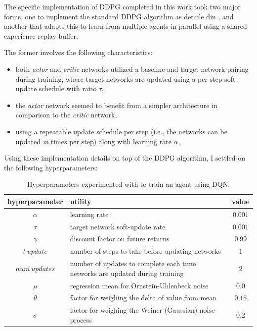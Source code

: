 \documentclass[11pt]{article}
\begin{document}
The specific implementation of DDPG completed in this work took two major forms, one to implement the standard DDPG algorithm as detaile din \cite{ddpg}, and another that adapts this to learn from multiple agents in parallel using a shared experience replay buffer.

The former involves the following characteristics:
\begin{itemize}
	\item both \textit{actor} and \textit{critic} networks utilized a baseline and target network pairing during training, where target networks are updated using a per-step soft-update schedule with ratio $\tau$,
	\item the \textit{actor} network seemed to benefit from a simpler architecture in comparison to the \textit{critic} network,
	\item using a repeatable update schedule per step (i.e., the networks can be updated \textit{m} times per step) along with learning rate $\alpha$,
\end{itemize}

 \FloatBarrier
 
 Using these implementation details on top of the DDPG algorithm, I settled on the following hyperparameters:
 
 \FloatBarrier
 
 \begin{table}[!ht]
 	\centering
 	\begin{tabular}{ c | p{6cm} | c }
 		\textbf{hyperparameter} & \textbf{utility} & \textbf{value} \\
 		\hline
 		$\alpha$ & learning rate & $0.001$ \\
 		$\tau$ & target network soft-update rate & $0.001$ \\
 		$\gamma$ & discount factor on future returns & $0.99$ \\
 		$t\ update$ & number of steps to take before updating networks & $1$ \\
 		$num\ updates$ & number of updates to complete each time networks are updated during training & $2$ \\
 		$\mu$ & regression mean for Ornstein-Uhlenbeck noise & $0.0$ \\
 		$\theta$ & factor for weighing the delta of value from mean & $0.15$ \\
 		$\sigma$ & factor for weighing the Weiner (Gaussian) noise process & $0.2$ \\
 		\hline
 	\end{tabular}
 	\caption{Hyperparameters experimented with to train an agent using DQN.}
 	\label{tbl:parameters}
 \end{table}
 
\end{document}
